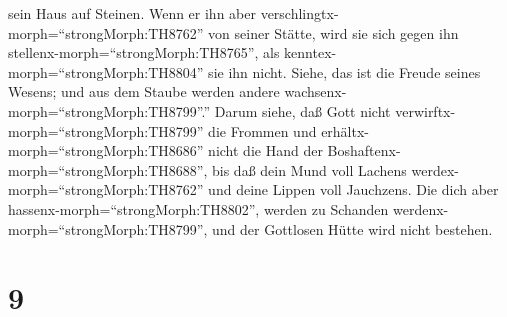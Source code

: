 sein Haus auf Steinen.  Wenn er ihn aber
verschlingtx-morph=``strongMorph:TH8762'' von seiner Stätte, wird sie
sich gegen ihn stellenx-morph=``strongMorph:TH8765'', als
kenntex-morph=``strongMorph:TH8804'' sie ihn nicht.  Siehe,
das ist die Freude seines Wesens; und aus dem Staube werden andere
wachsenx-morph=``strongMorph:TH8799''.''  Darum siehe, daß
Gott nicht verwirftx-morph=``strongMorph:TH8799'' die Frommen und
erhältx-morph=``strongMorph:TH8686'' nicht die Hand der
Boshaftenx-morph=``strongMorph:TH8688'',  bis daß dein Mund
voll Lachens werdex-morph=``strongMorph:TH8762'' und deine Lippen voll
Jauchzens.  Die dich aber
hassenx-morph=``strongMorph:TH8802'', werden zu Schanden
werdenx-morph=``strongMorph:TH8799'', und der Gottlosen Hütte wird nicht
bestehen.

\hypertarget{section-8}{%
\section{9}\label{section-8}}

